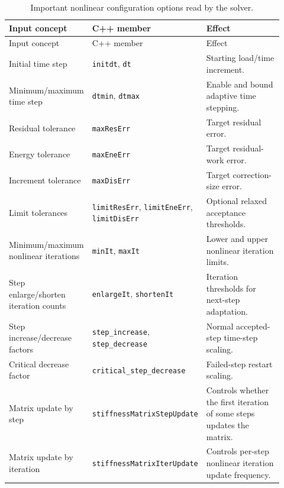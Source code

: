 \documentclass[11pt,a4paper]{article}
\newcommand{\code}[1]{\ifmmode\text{\texttt{\detokenize{#1}}}\else\nolinkurl{#1}\fi}
\begin{document}
\begin{longtable}{p{0.24\linewidth} p{0.34\linewidth} p{0.34\linewidth}}
\caption{Important nonlinear configuration options read by the solver.}
\label{tab:config}\\
\toprule
Input concept & C++ member & Effect \\
\midrule
\endfirsthead
\toprule
Input concept & C++ member & Effect \\
\midrule
\endhead
Initial time step & \code{initdt}, \code{dt} &
Starting load/time increment. \\

Minimum/maximum time step & \code{dtmin}, \code{dtmax} &
Enable and bound adaptive time stepping. \\

Residual tolerance & \code{maxResErr} &
Target residual error. \\

Energy tolerance & \code{maxEneErr} &
Target residual-work error. \\

Increment tolerance & \code{maxDisErr} &
Target correction-size error. \\

Limit tolerances & \code{limitResErr}, \code{limitEneErr}, \code{limitDisErr} &
Optional relaxed acceptance thresholds. \\

Minimum/maximum nonlinear iterations & \code{minIt}, \code{maxIt} &
Lower and upper nonlinear iteration limits. \\

Step enlarge/shorten iteration counts & \code{enlargeIt}, \code{shortenIt} &
Iteration thresholds for next-step adaptation. \\

Step increase/decrease factors & \code{step_increase}, \code{step_decrease} &
Normal accepted-step time-step scaling. \\

Critical decrease factor & \code{critical_step_decrease} &
Failed-step restart scaling. \\

Matrix update by step & \code{stiffnessMatrixStepUpdate} &
Controls whether the first iteration of some steps updates the matrix. \\

Matrix update by iteration & \code{stiffnessMatrixIterUpdate} &
Controls per-step nonlinear iteration update frequency. \\


\end{longtable}
\end{document}
